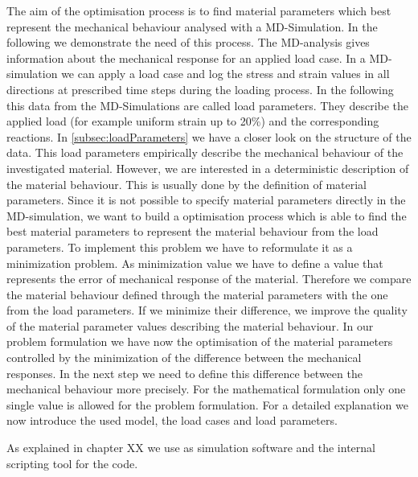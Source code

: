     The aim of the optimisation process is to find material parameters which best represent the mechanical behaviour analysed with a MD-Simulation. In the following we demonstrate the need of this process.
    The MD-analysis gives information about the mechanical response for an applied load case. In a MD-simulation we can apply a load case and log the stress and strain values in all directions at prescribed time steps during the loading process. In the following this data from the MD-Simulations are called load parameters. They describe the applied load (for example uniform strain up to 20\(\%\)) and the corresponding reactions. In \autoref{subsec:loadParameters} we have a closer look on the structure of the data. 
    This load parameters empirically describe the mechanical behaviour of the investigated material. However, we are interested in a deterministic description of the material behaviour. This is usually done by the definition of material parameters. Since it is not possible to specify material parameters directly in the MD-simulation, we want to build a optimisation process which is able to find the best material parameters to represent the material behaviour from the load parameters. To implement this problem we have to reformulate it as a minimization problem. As minimization value we have to define a value that represents the error of mechanical response of the material. Therefore we compare the material behaviour defined through the material parameters with the one from the load parameters. If we minimize their difference, we improve the quality of the material parameter values describing the material behaviour. In our problem formulation we have now the optimisation of the material parameters controlled by the minimization of the difference between the mechanical responses. In the next step we need to define this difference between the mechanical behaviour more precisely. For the mathematical formulation only one single value is allowed for the problem formulation. For a detailed explanation we now introduce the used model, the load cases and load parameters.

    As explained in chapter XX we use  as simulation software and the  internal scripting tool for the code. 
    
    
